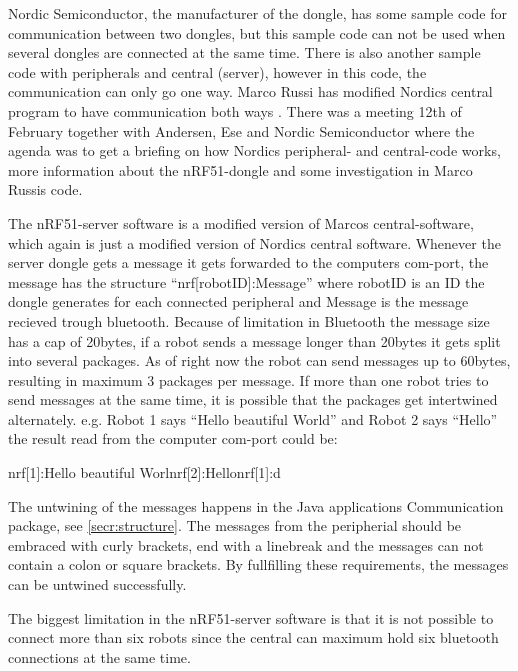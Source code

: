 Nordic Semiconductor, the manufacturer of the dongle, has some sample code for communication between two dongles, but this sample code can not be used when several dongles are connected at the same time. There is also another sample code with peripherals and central (server), however in this code, the communication can only go one way. Marco Russi has modified Nordics central program to have communication both ways \cite{marcoRussi}. There was a meeting 12th of February together with Andersen, Ese and Nordic Semiconductor where the agenda was to get a briefing on how Nordics peripheral- and central-code works, more information about the nRF51-dongle and some investigation in Marco Russis code.

The nRF51-server software is a modified version of Marcos central-software, which again is just a modified version of Nordics central software. Whenever the server dongle gets a message it gets forwarded to the computers \acrshort{com}-port, the message has the structure ``nrf[robotID]:Message'' where robotID is an ID the dongle generates for each connected peripheral and Message is the message recieved trough bluetooth. Because of limitation in Bluetooth the message size has a cap of 20bytes, if a robot sends a message longer than 20bytes it gets split into several packages. As of right now the robot can send messages up to 60bytes, resulting in maximum 3 packages per message. If more than one robot tries to send messages at the same time, it is possible that the packages get intertwined alternately. e.g. Robot 1 says ``Hello beautiful World'' and Robot 2 says ``Hello'' the result read from the computer \acrshort{com}-port could be: 

nrf[1]:Hello beautiful Worlnrf[2]:Hellonrf[1]:d

The untwining of the messages happens in the Java applications Communication package, see \ref{secr:structure}. The messages from the peripherial should be embraced with curly brackets, end with a linebreak and the messages can not contain a colon or square brackets. By fullfilling these requirements, the messages can be untwined successfully.

The biggest limitation in the nRF51-server software is that it is not possible to connect more than six robots since the central can maximum hold six bluetooth connections at the same time.

